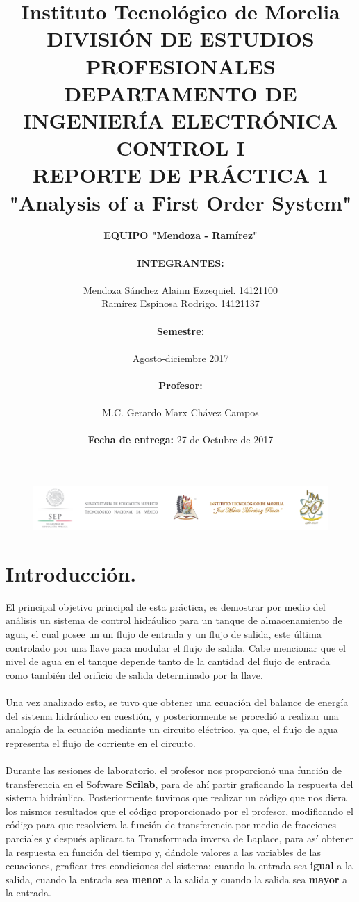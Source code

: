 \documentclass[letterpaper]{article}
\title{Instituto Tecnológico de Morelia\\
		{\small DIVISIÓN DE ESTUDIOS PROFESIONALES
		\\DEPARTAMENTO DE INGENIERÍA ELECTRÓNICA\\CONTROL I\\\vspace*{0.2in} REPORTE DE PRÁCTICA 1}\\ "Analysis of a First Order System"}
\author{
	\textbf{EQUIPO "Mendoza - Ramírez"} \\\\
	\textbf{INTEGRANTES:}\\
	\\ Mendoza Sánchez Alainn Ezzequiel.	14121100 
	\\ Ramírez Espinosa 	Rodrigo.	14121137 \\\\ 
	\textbf{Semestre:} \\\\ Agosto-diciembre 2017\\\\ 
	\textbf{Profesor:} \\\\ M.C. Gerardo Marx Chávez Campos \\\\ 
	\textbf{Fecha de entrega:} 27 de Octubre de 2017}
\date{}
\begin{document}
		\begin{figure}[t]
		\centering
		\includegraphics[scale=0.7]{Header}
	\end{figure}
	\maketitle
	\pagebreak
	\newpage
	\section{Introducción.}
	El principal objetivo principal de esta práctica, es demostrar por medio del análisis un sistema de control hidráulico para un tanque de almacenamiento de agua, el cual posee un un flujo de entrada y un flujo de salida, este última controlado por una llave para modular el flujo de salida. Cabe mencionar que el nivel de agua en el tanque depende tanto de la cantidad del flujo de entrada como también del orificio de salida determinado por la llave.\\\\
	Una vez analizado esto, se tuvo que obtener una ecuación del balance de energía del sistema hidráulico en cuestión, y posteriormente se procedió a realizar una analogía de la ecuación mediante un circuito eléctrico, ya que, el flujo de agua representa el flujo de corriente en el circuito.\\\\
	Durante las sesiones de laboratorio, el profesor nos proporcionó una función de transferencia en el Software \textbf{Scilab}, para de ahí partir graficando la respuesta del sistema hidráulico. Posteriormente tuvimos que realizar un código que nos diera los mismos resultados que el código proporcionado por el profesor, modificando el código para que resolviera la función de transferencia por medio de fracciones parciales y después aplicara ta Transformada inversa de Laplace, para así obtener la respuesta en función del tiempo y, dándole valores a las variables de las ecuaciones, graficar tres condiciones del sistema: cuando la entrada sea \textbf{igual} a la salida, cuando la entrada sea \textbf{menor} a la salida y cuando la salida sea \textbf{mayor} a la entrada.
	
	\newpage
\end{document}
